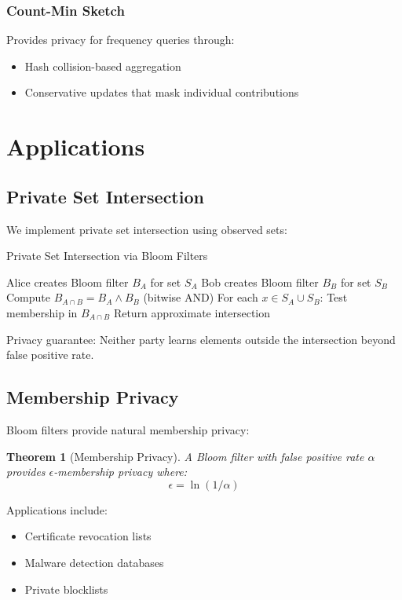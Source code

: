 \documentclass[11pt]{article}
\newtheorem{theorem}{Theorem}
\begin{document}
\subsubsection{Count-Min Sketch}
Provides privacy for frequency queries through:
\begin{itemize}
\item Hash collision-based aggregation
\item Conservative updates that mask individual contributions
\end{itemize}

\section{Applications}

\subsection{Private Set Intersection}

We implement private set intersection using observed sets:

\begin{algorithm}
\caption{Private Set Intersection via Bloom Filters}
\begin{algorithmic}[1]
\STATE Alice creates Bloom filter $B_A$ for set $S_A$
\STATE Bob creates Bloom filter $B_B$ for set $S_B$
\STATE Compute $B_{A \cap B} = B_A \land B_B$ (bitwise AND)
\STATE For each $x \in S_A \cup S_B$:
\STATE \quad Test membership in $B_{A \cap B}$
\STATE Return approximate intersection
\end{algorithmic}
\end{algorithm}

Privacy guarantee: Neither party learns elements outside the intersection beyond false positive rate.

\subsection{Membership Privacy}

Bloom filters provide natural membership privacy:

\begin{theorem}[Membership Privacy]
A Bloom filter with false positive rate $\alpha$ provides $\epsilon$-membership privacy where:
$$\epsilon = \ln(1/\alpha)$$
\end{theorem}

Applications include:
\begin{itemize}
\item Certificate revocation lists
\item Malware detection databases
\item Private blocklists
\end{itemize}
\end{document}
